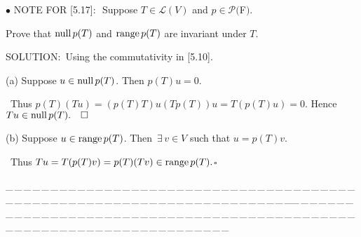 \documentclass[a4paper, 11pt, UTF8]{article}
\def\range{\textup{range}\,}
\def\null{\textup{null\,}}
\def\Lm{\mathcal{L}}
\def\Po{\mathcal{P}}
\begin{document}
\begin{large}
{\small $\bullet$} {\timesbf\Large N{\normalsize OTE} F{\normalsize OR} [5.17]:} \,\,{\timessl\Large Suppose $T\in\Lm(V)$ and $p\in\Po(${\timesbf F}$)$.}\par\qquad\qquad\qquad\qquad\qquad
{\timessl\Large Prove that $\null p(T)$ and $\range p(T)$ are invariant under $T$.}\par
{\timesbf S\footnotesize{OLUTION:}}\,\,\,Using the commutativity in [5.10].\par\quad
(a) Suppose $u\in\null p(T)$. Then $p(T)u = 0$.\par\qquad\,
Thus $p(T)(Tu) = (p(T) T)u (Tp(T))u=T(p(T)u) = 0$. Hence $Tu\in\null p(T).\quad\square$\par\quad
(b) Suppose $u\in\range p(T)$. Then $\,\exists\,v\in V$ such that $u = p(T)v$.\par\qquad\,
Thus $Tu = T(p(T)v) = p(T)(Tv)\in\range p(T).$\quad$\square$\par
{\tiny \_\,\_\,\_\,\_\,\_\,\_\,\_\,\_\,\_\,\_\,\_\,\_\,\_\,\_\,\_\,\_\,\_\,\_\,\_\,\_\,\_\,\_\,\_\,\_\,\_\,\_\,\_\,\_\,\_\,\_\,\_\,\_\,\_\,\_\,\_\,\_\,\_\,\_\,\_\,\_\,\_\,\_\,\_\,\_\,\_\,\_\,\_\,\_\,\_\,\_\,\_\,\_\,\_\,\_\,\_\,\_\,\_\,\_\,\_\,\_\,\_\,\_\,\_\,\_\,\_\,\_\,\_\,\_\,\_\,\_\,\_\_\,\_\,\_\,\_\,\_\,\_\,\_\,\_\,\_\,\_\,\_\,\_\,\_\,\_\,\_\,\_\,\_\,\_\,\_\,\_\,\_\,\_\,\_\,\_\,\_\,\_\,\_\,\_\,\_\,\_\,\_\,\_\,\_\,\_\,\_\,\_\,\_\,\_\,\_\,\_\,\_\,\_\,\_\,\_\,\_\,\_\,\_\,\_\,\_\,\_\,\_\,\_\,\_\,\_\,\_\,\_\,\_\,\_\,\_\,\_\,\_\,\_\,\_\,\_\,\_\,\_\,\_\,\_\,\_\,\_\,\_}\par


\end{large}
\end{document}
